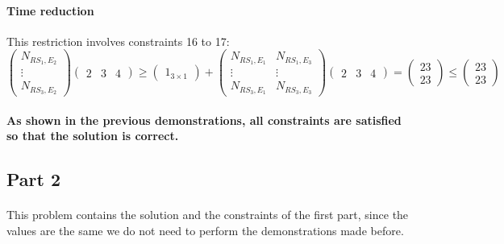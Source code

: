 \paragraph{Time reduction}
This restriction involves constraints 16 to 17:
\begin{equation}
    \begin{pmatrix}
        N_{RS_1,E_2}\\
        \vdots\\
        N_{RS_3,E_2}
    \end{pmatrix}
    \begin{pmatrix}
        2 & 3 & 4
    \end{pmatrix}
    \geq
    \begin{pmatrix}
        1_{3 \times 1}
    \end{pmatrix}
    +
    \begin{pmatrix}
        N_{RS_1,E_1} & N_{RS_1,E_3}\\
        \vdots & \vdots\\
        N_{RS_3,E_1} & N_{RS_3,E_3}
    \end{pmatrix}
    \begin{pmatrix}
        2 & 3 & 4
    \end{pmatrix}
    =
    \begin{pmatrix}
        23\\
        23
    \end{pmatrix}
    \leq
    \begin{pmatrix}
        23\\
        23
    \end{pmatrix}
\end{equation}

\paragraph{As shown in the previous demonstrations, all constraints are satisfied so that the solution is correct.}




\subsection{Part 2}

\paragraph{}
This problem contains the solution and the constraints of the first part, since the values are the same we do not need to perform the demonstrations made before.

